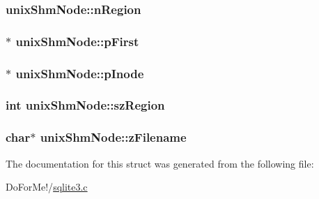 \hypertarget{structunix_shm_node_aaf1fceb640b3959424403885c0419a46}{
\subsubsection[{n\-Region}]{ unix\-Shm\-Node\-::n\-Region}}\label{structunix_shm_node_aaf1fceb640b3959424403885c0419a46}
\hypertarget{structunix_shm_node_a0ddd6c4625acf5994a60b0c368bc665e}{
\subsubsection[{p\-First}]{$\ast$ unix\-Shm\-Node\-::p\-First}}\label{structunix_shm_node_a0ddd6c4625acf5994a60b0c368bc665e}
\hypertarget{structunix_shm_node_ab6bc1cf84d65887a3395da6406843817}{
\subsubsection[{p\-Inode}]{$\ast$ unix\-Shm\-Node\-::p\-Inode}}\label{structunix_shm_node_ab6bc1cf84d65887a3395da6406843817}
\hypertarget{structunix_shm_node_ae8126f9db70a758c2f340ec06869e02b}{
\subsubsection[{sz\-Region}]{\setlength{\rightskip}{0pt plus 5cm}int unix\-Shm\-Node\-::sz\-Region}}\label{structunix_shm_node_ae8126f9db70a758c2f340ec06869e02b}
\hypertarget{structunix_shm_node_a188c3bc5fcb4666ad0817ac093e7505d}{
\subsubsection[{z\-Filename}]{\setlength{\rightskip}{0pt plus 5cm}char$\ast$ unix\-Shm\-Node\-::z\-Filename}}\label{structunix_shm_node_a188c3bc5fcb4666ad0817ac093e7505d}


The documentation for this struct was generated from the following file\-:\begin{DoxyCompactItemize}
\item 
Do\-For\-Me!/\hyperlink{sqlite3_8c}{sqlite3.\-c}\end{DoxyCompactItemize}
